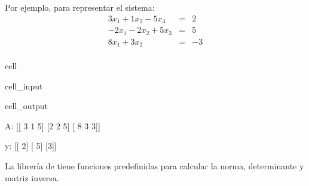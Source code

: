 \documentclass[letterpaper,10pt,english]{jupyterBook}
\begin{document}
\sphinxAtStartPar
Por ejemplo, para representar el sistema:
\begin{eqnarray*}
3x_1 + 1x_2 - 5x_3 &=& 2 \\
-2x_1 - 2x_2 + 5x_3 &=& 5 \\
8x_1 + 3x_2  &=& -3 \\
\end{eqnarray*}
\begin{sphinxuseclass}{cell}\begin{sphinxVerbatimInput}

\begin{sphinxuseclass}{cell_input}
\begin{sphinxVerbatim}[commandchars=\\\{\}]
   

  \PYG{p}{[}\PYG{p}{[}    \PYG{p}{]}
              \PYG{p}{[}   \PYG{p}{]}
              \PYG{p}{[}     \PYG{p}{]}\PYG{p}{]}

  \PYG{p}{[}\PYG{p}{[}\PYG{p}{]} \PYG{p}{[}\PYG{p}{]} \PYG{p}{[}\PYG{p}{]}\PYG{p}{]}

\end{sphinxVerbatim}

\end{sphinxuseclass}\end{sphinxVerbatimInput}
\begin{sphinxVerbatimOutput}

\begin{sphinxuseclass}{cell_output}
\begin{sphinxVerbatim}[commandchars=\\\{\}]
A:
 [[ 3  1 \PYGZhy{}5]
 [\PYGZhy{}2 \PYGZhy{}2  5]
 [ 8  3  3]]

y:
 [[ 2]
 [ 5]
 [\PYGZhy{}3]]
\end{sphinxVerbatim}

\end{sphinxuseclass}\end{sphinxVerbatimOutput}

\end{sphinxuseclass}
\sphinxAtStartPar
La librería  de  tiene funciones predefinidas para calcular la norma, determinante y matriz inversa.
\end{document}

